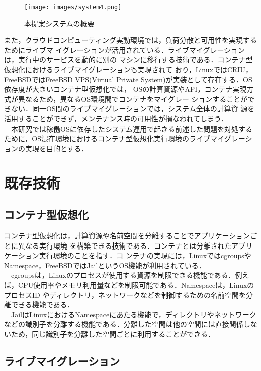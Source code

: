 \documentclass[11pt]{jarticle}
\begin{document}
\begin{figure*}[t]
  \centering
  \texttt{[image: images/system4.png]} \\
  \caption{本提案システムの概要}
  \label{fig:system}
\end{figure*}

また，クラウドコンピューティング実動環境では，負荷分散と可用性を実現するためにライブマ
イグレーションが活用されている．ライブマイグレーションは，実行中のサービスを動的に別の
マシンに移行する技術である．コンテナ型仮想化におけるライブマイグレーションも実現されて
おり，LinuxではCRIU\cite{container_live,criu}，FreeBSDではFreeBSD VPS(Virtual Private
 System)\cite{freebsd-vps}が実装として存在する．OS依存度が大きいコンテナ型仮想化では，
 OSの計算資源やAPI，コンテナ実現方式が異なるため，異なるOS環境間でコンテナをマイグレー
 ションすることができない．同一OS間のライブマイグレーションでは，システム全体の計算資
 源を活用することができず，メンテナンス時の可用性が損なわれてしまう．\\
　本研究では稼働OSに依存したシステム運用で起きる前述した問題を対処するために，OS混在環境におけるコンテナ型仮想化実行環境のライブマイグレーションの実現を目的とする．

\section{既存技術}
\subsection{コンテナ型仮想化}
\label{sec:container}

コンテナ型仮想化は，計算資源や名前空間を分離することでアプリケーションごとに異なる実行環境
を構築できる技術である．コンテナとは分離されたアプリケーション実行環境のことを指す．コ
ンテナの実現には，LinuxではcgroupsやNamespace，FreeBSDではJailというOS機能が利用されている．\\
　cgroupsは，Linuxのプロセスが使用する資源を制限できる機能である．例えば，CPU使用率やメモリ利用量などを制限可能である．Namespaceは，LinuxのプロセスID
やディレクトリ，ネットワークなどを制御するための名前空間を分離できる機能である．\\
　JailはLinuxにおけるNamespaceにあたる機能で，ディレクトリやネットワークなどの識別子を分離する機能である．分離した空間は他の空間には直接関係しないため，同じ識別子を分離した空間ごとに利用することができる．

\subsection{ライブマイグレーション}
\end{document}

